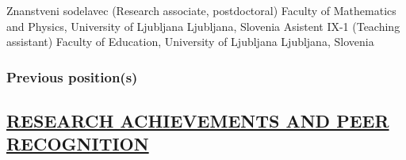 {Znanstveni sodelavec (Research associate, postdoctoral)}%
%
{%
{Faculty of Mathematics and Physics, University of Ljubljana}%
%
}
{{Ljubljana, Slovenia}}
{}
{}
{Asistent IX-1 (Teaching assistant)}%
%
{%
{Faculty of Education, University of Ljubljana}%
%
}
{{Ljubljana, Slovenia}}
{}
{}

\subsubsection*{Previous position(s)}


\subsection*{\underline{RESEARCH ACHIEVEMENTS AND PEER RECOGNITION}}


